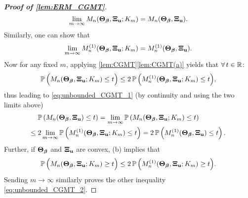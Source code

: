 \begin{proof}[\textbf{Proof of \cref{lem:ERM_CGMT}}]
\begin{equation*}
        \lim_{m \to \infty} M_n (\bTheta_{\vbeta}, \bXi_{\bu}; K_m) = M_n (\bTheta_{\vbeta}, \bXi_{\bu}).
    \end{equation*}
    Similarly, one can show that
    \begin{equation*}
        \lim_{m \to \infty} M_n^{(1)} (\bTheta_{\vbeta}, \bXi_{\bu}; K_m) = M_n^{(1)} (\bTheta_{\vbeta}, \bXi_{\bu}).
    \end{equation*}
    Now for any fixed $m$, applying \cref{lem:CGMT}\ref{lem:CGMT(a)} yields that $\forall\, t \in \R$:
    \begin{equation*}
        \P \, \Bigl( M_n(\bTheta_{\vbeta}, \bXi_{\bu}; K_m) \le t \Bigr) 
        \le 2 \, \P \, \Bigl( M_n^{(1)}(\bTheta_{\vbeta}, \bXi_{\bu}; K_m) \le t \Bigr),
    \end{equation*}
    thus leading to \cref{eq:unbounded_CGMT_1} (by continuity and using the two limits above)
    \begin{align*}
        & \P \left( M_n(\bTheta_{\vbeta}, \bXi_{\bu}) \le t \right) =  
        \lim_{m \to \infty} \P \left( M_n(\bTheta_{\vbeta}, \bXi_{\bu}; K_m) \le t \right) \\
        \le {} & 2 \lim_{m \to \infty} \P \left( M_n^{(1)}(\bTheta_{\vbeta}, \bXi_{\bu}; K_m) \le t \right)
        =  2 \, \P \left( M_n^{(1)}(\bTheta_{\vbeta}, \bXi_{\bu}) \le t \right).
    \end{align*}
    Further, if $\bTheta_{\vbeta}$ and $\bXi_{\bu}$ are convex, (b) implies that
    \begin{equation*}
        \P \, \Bigl( M_n(\bTheta_{\vbeta}, \bXi_{\bu}; K_m) \ge t \Bigr) 
        \le 2 \, \P \, \Bigl( M_n^{(1)}(\bTheta_{\vbeta}, \bXi_{\bu}; K_m) \ge t \Bigr).
    \end{equation*}
    Sending $m \to \infty$ similarly proves the other inequality \cref{eq:unbounded_CGMT_2}.
\end{proof}




